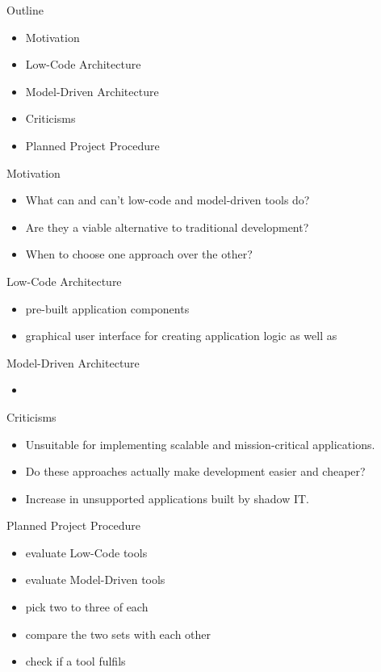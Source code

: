 \documentclass[aspectratio=169]{beamer}
\date{\formatdate{20}{10}{2020}}
\institute{supervised by Prof. Dr. Ruth Breu}
\begin{document}
  \maketitle

  \begin{frame}{Outline}
    \begin{itemize}
      \item Motivation
      \item Low-Code Architecture
      \item Model-Driven Architecture
      \item Criticisms
      \item Planned Project Procedure
    \end{itemize}
  \end{frame}

  \begin{frame}{Motivation}
    \begin{itemize}
      \item What can and can't low-code and model-driven tools do?
      \item Are they a viable alternative to traditional development?
      \item When to choose one approach over the other?
    \end{itemize}
  \end{frame}

  \begin{frame}{Low-Code Architecture}
    \begin{itemize}
      \item pre-built application components
      \item graphical user interface for creating application logic as well as
    \end{itemize}
  \end{frame}

  \begin{frame}{Model-Driven Architecture}
    \begin{itemize}
      \item
    \end{itemize}
  \end{frame}

  \begin{frame}{Criticisms}
    \begin{itemize}
      \item Unsuitable for implementing scalable and mission-critical applications.
      \item Do these approaches actually make development easier and cheaper?
      \item Increase in unsupported applications built by shadow IT.
    \end{itemize}
  \end{frame}

  \begin{frame}{Planned Project Procedure}
    \begin{itemize}
      \item evaluate Low-Code tools
      \item evaluate Model-Driven tools
      \item pick two to three of each
      \item compare the two sets with each other
      \item check if a tool fulfils
    \end{itemize}
  \end{frame}
\end{document}
